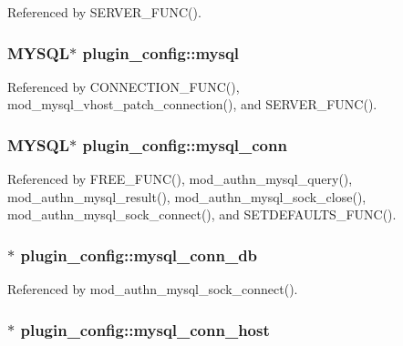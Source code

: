 Referenced by S\-E\-R\-V\-E\-R\-\_\-\-F\-U\-N\-C().

\hypertarget{structplugin__config_a120b5c2ad0db3bab2a40bd13952d94b2}{
\subsubsection[{mysql}]{\setlength{\rightskip}{0pt plus 5cm}M\-Y\-S\-Q\-L$\ast$ plugin\-\_\-config\-::mysql}}\label{structplugin__config_a120b5c2ad0db3bab2a40bd13952d94b2}


Referenced by C\-O\-N\-N\-E\-C\-T\-I\-O\-N\-\_\-\-F\-U\-N\-C(), mod\-\_\-mysql\-\_\-vhost\-\_\-patch\-\_\-connection(), and S\-E\-R\-V\-E\-R\-\_\-\-F\-U\-N\-C().

\hypertarget{structplugin__config_aa03fa38a977ee3a43df127dd73d01ec2}{
\subsubsection[{mysql\-\_\-conn}]{\setlength{\rightskip}{0pt plus 5cm}M\-Y\-S\-Q\-L$\ast$ plugin\-\_\-config\-::mysql\-\_\-conn}}\label{structplugin__config_aa03fa38a977ee3a43df127dd73d01ec2}


Referenced by F\-R\-E\-E\-\_\-\-F\-U\-N\-C(), mod\-\_\-authn\-\_\-mysql\-\_\-query(), mod\-\_\-authn\-\_\-mysql\-\_\-result(), mod\-\_\-authn\-\_\-mysql\-\_\-sock\-\_\-close(), mod\-\_\-authn\-\_\-mysql\-\_\-sock\-\_\-connect(), and S\-E\-T\-D\-E\-F\-A\-U\-L\-T\-S\-\_\-\-F\-U\-N\-C().

\hypertarget{structplugin__config_a529cf511ec42c8512cb03004e5b4d3fe}{
\subsubsection[{mysql\-\_\-conn\-\_\-db}]{$\ast$ plugin\-\_\-config\-::mysql\-\_\-conn\-\_\-db}}\label{structplugin__config_a529cf511ec42c8512cb03004e5b4d3fe}


Referenced by mod\-\_\-authn\-\_\-mysql\-\_\-sock\-\_\-connect().

\hypertarget{structplugin__config_a01d542944d79302362c000102d9e7e9d}{
\subsubsection[{mysql\-\_\-conn\-\_\-host}]{$\ast$ plugin\-\_\-config\-::mysql\-\_\-conn\-\_\-host}}\label{structplugin__config_a01d542944d79302362c000102d9e7e9d}


